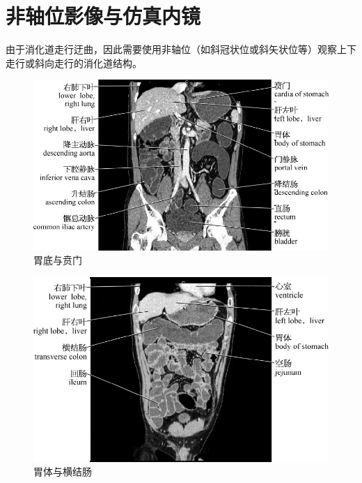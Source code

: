 \section{非轴位影像与仿真内镜}

由于消化道走行迂曲，因此需要使用非轴位（如斜冠状位或斜矢状位等）观察上下走行或斜向走行的消化道结构。

\begin{figure}[!htbp]
 \centering
 \includegraphics{./images/Image00175.jpg}
 \captionsetup{justification=centering}
 \caption{胃底与贲门}
  \end{figure} 
 \FloatBarrier

\begin{figure}[!htbp]
 \centering
 \includegraphics{./images/Image00176.jpg}
 \captionsetup{justification=centering}
 \caption{胃体与横结肠}
  \end{figure} 
 \FloatBarrier

